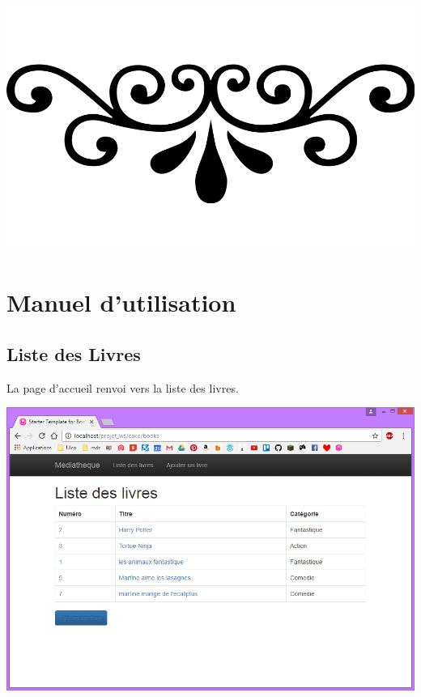 \documentclass{report}
\begin{document}
	\begin{center}
	\includegraphics[scale=0.1]{img/fioritures.png} 
	\end{center} 
	
	\chapter{Manuel d'utilisation}
	
		\section{Liste des Livres}
		La page d'accueil renvoi vers la liste des livres.	
		\begin{center}
			\includegraphics[scale=0.5]{img/manuel/ListeDesLivres.png}  
		\end{center}
		
\end{document}
